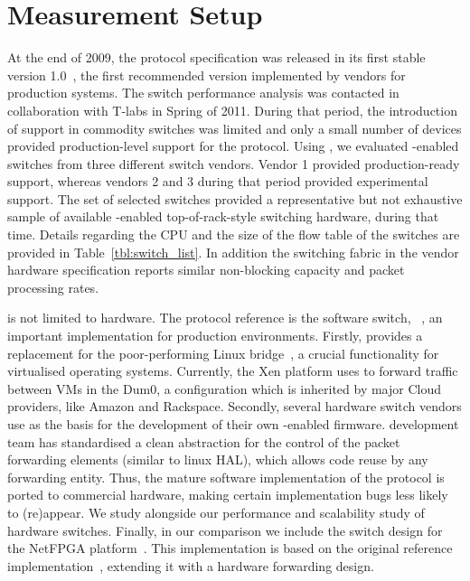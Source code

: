 \section{Measurement Setup}\label{sec:oflops-switches}

At the end of 2009, the \of protocol specification was released in its first
stable version 1.0~\cite{openflow-spec}, the first recommended version
implemented by vendors for production systems.  The switch performance analysis
was contacted in collaboration with T-labs in Spring of 2011. During that
period, the introduction of \of support in commodity switches was limited and
only a small number of devices provided production-level support for the
protocol.  Using \oflops, we evaluated \of-enabled switches from three different
switch vendors.  Vendor 1 provided production-ready \of support, whereas vendors
2 and 3 during that period provided experimental \of support.  The set of
selected switches provided a representative but not exhaustive sample of
available \of-enabled top-of-rack-style switching hardware, during that time.
Details regarding the CPU and the size of the flow table of the switches are
provided in Table~\ref{tbl:switch_list}. In addition the switching fabric in the
vendor hardware specification reports similar non-blocking capacity and packet
processing rates. 

\of is not limited to hardware. The \of protocol reference is the software
switch, \ovs~\cite{openvswitch}, an important implementation for production
environments. Firstly, \ovs provides a replacement for the poor-performing Linux
bridge~\cite{bianco10}, a crucial functionality for virtualised operating
systems.  Currently, the Xen platform uses \ovs to forward traffic between VMs
in the Dum0, a configuration which is inherited by major Cloud providers, like
Amazon and Rackspace.  Secondly, several hardware switch vendors use \ovs as the
basis for the development of their own \of-enabled firmware.  \ovs development
team has standardised a clean abstraction for the control of the packet
forwarding elements (similar to linux HAL), which allows code reuse by any
forwarding entity. Thus, the mature software implementation of the \of protocol
is ported to commercial hardware, making certain implementation bugs less likely
to (re)appear.  We study \ovs alongside our performance and scalability study of
hardware switches. Finally, in our comparison we include the \of switch design
for the NetFPGA platform~\cite{openflow-netfpga}. This implementation is based
on the original \of reference implementation~\cite{of-reference-impl}, extending
it with a hardware forwarding design. 

